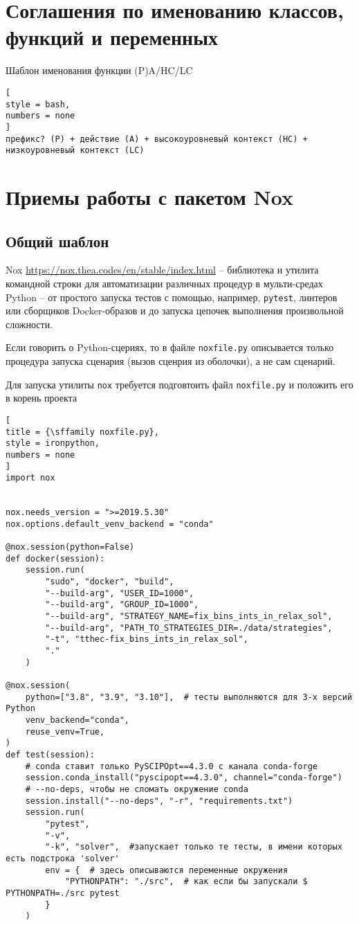 \documentclass[%
	11pt,
	a4paper,
	utf8,
		]{article}
\begin{document}
\section{Соглашения по именованию классов, функций и переменных}

Шаблон именования функции (P)A/HC/LC
\begin{lstlisting}[
style = bash,
numbers = none
]
префикс? (P) + действие (A) + высокоуровневый контекст (HC) + низкоуровневый контекст (LC)
\end{lstlisting}

\section{Приемы работы с пакетом Nox}

\subsection{Общий шаблон}

Nox \url{https://nox.thea.codes/en/stable/index.html} -- библиотека и утилита командной строки для автоматизации различных процедур в мульти-средах Python -- от простого запуска тестов с помощью, например, \verb|pytest|, линтеров или сборщиков Docker-образов и до запуска цепочек выполнения произвольной сложности.

Если говорить о Python-сцериях, то в файле \verb|noxfile.py| описывается только процедура запуска сценария (вызов сценрия из оболочки), а не сам сценарий.

Для запуска утилиты \verb|nox| требуется подговтоить файл \verb|noxfile.py| и положить его в корень проекта
\begin{lstlisting}[
title = {\sffamily noxfile.py},
style = ironpython,
numbers = none	
]
import nox


nox.needs_version = ">=2019.5.30"
nox.options.default_venv_backend = "conda"

@nox.session(python=False)
def docker(session):
	session.run(
		"sudo", "docker", "build",
		"--build-arg", "USER_ID=1000",
		"--build-arg", "GROUP_ID=1000",
		"--build-arg", "STRATEGY_NAME=fix_bins_ints_in_relax_sol",
		"--build-arg", "PATH_TO_STRATEGIES_DIR=./data/strategies",
		"-t", "tthec-fix_bins_ints_in_relax_sol",
		"."
	)

@nox.session(
    python=["3.8", "3.9", "3.10"],  # тесты выполняются для 3-х версий Python
    venv_backend="conda",
    reuse_venv=True,
)
def test(session):
    # conda ставит только PySCIPOpt==4.3.0 с канала conda-forge
    session.conda_install("pyscipopt==4.3.0", channel="conda-forge")
    # --no-deps, чтобы не сломать окружение conda
    session.install("--no-deps", "-r", "requirements.txt")
    session.run(
        "pytest",
        "-v",
        "-k", "solver",  #запускает только те тесты, в имени которых есть подстрока 'solver'
        env = {  # здесь описываются переменные окружения
            "PYTHONPATH": "./src",  # как если бы запускали $ PYTHONPATH=./src pytest
        }
    )
\end{lstlisting}
\end{document}
